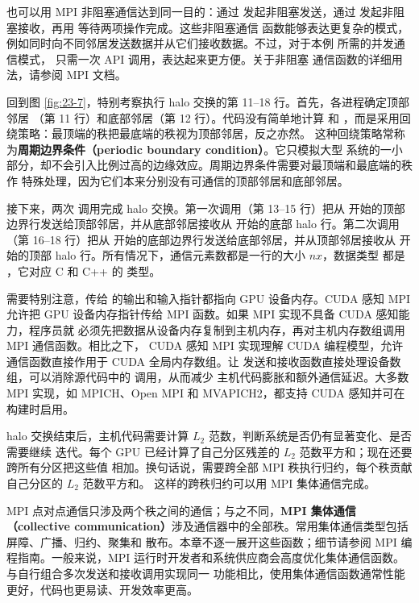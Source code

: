 也可以用 MPI 非阻塞通信达到同一目的：通过  发起非阻塞发送，通过
 发起非阻塞接收，再用  等待两项操作完成。这些非阻塞通信
函数能够表达更复杂的模式，例如同时向不同邻居发送数据并从它们接收数据。不过，对于本例
所需的并发通信模式， 只需一次 API 调用，表达起来更方便。关于非阻塞
通信函数的详细用法，请参阅 MPI 文档\cite{ch23-mpi}。

回到图 \ref{fig:23-7}，特别考察执行 halo 交换的第 11--18 行。首先，各进程确定顶部邻居
（第 11 行）和底部邻居（第 12 行）。代码没有简单地计算  和
，而是采用回绕策略：最顶端的秩把最底端的秩视为顶部邻居，反之亦然。
这种回绕策略常称为\textbf{周期边界条件（periodic boundary condition）}。它只模拟大型
系统的一小部分，却不会引入比例过高的边缘效应。周期边界条件需要对最顶端和最底端的秩作
特殊处理，因为它们本来分别没有可通信的顶部邻居和底部邻居。

接下来，两次  调用完成 halo 交换。第一次调用（第 13--15 行）把从
 开始的顶部边界行发送给顶部邻居，并从底部邻居接收从
 开始的底部 halo 行。第二次调用（第 16--18 行）把从
 开始的底部边界行发送给底部邻居，并从顶部邻居接收从
 开始的顶部 halo 行。所有情况下，通信元素数都是一行的大小 $nx$，数据类型
都是 ，它对应 C 和 C++ 的  类型。

需要特别注意，传给  的输出和输入指针都指向 GPU 设备内存。CUDA 感知
MPI 允许把 GPU 设备内存指针传给 MPI 函数。如果 MPI 实现不具备 CUDA 感知能力，程序员就
必须先把数据从设备内存复制到主机内存，再对主机内存数组调用 MPI 通信函数。相比之下，
CUDA 感知 MPI 实现理解 CUDA 编程模型，允许通信函数直接作用于 CUDA 全局内存数组。让
发送和接收函数直接处理设备数组，可以消除源代码中的  调用，从而减少
主机代码膨胀和额外通信延迟。大多数 MPI 实现，如 MPICH\cite{ch23-mpich}、Open
MPI\cite{ch23-openmpi} 和 MVAPICH2\cite{ch23-mvapich}，都支持 CUDA 感知并可在构建时启用。

halo 交换结束后，主机代码需要计算 $L_2$ 范数，判断系统是否仍有显著变化、是否需要继续
迭代。每个 GPU 已经计算了自己分区残差的 $L_2$ 范数平方和；现在还要跨所有分区把这些值
相加。换句话说，需要跨全部 MPI 秩执行归约，每个秩贡献自己分区的 $L_2$ 范数平方和。
这样的跨秩归约可以用 MPI 集体通信完成。

MPI 点对点通信只涉及两个秩之间的通信；与之不同，\textbf{MPI 集体通信（collective
communication）}涉及通信器中的全部秩。常用集体通信类型包括屏障、广播、归约、聚集和
散布。本章不逐一展开这些函数；细节请参阅 MPI 编程指南\cite{ch23-mpi}。一般来说，MPI
运行时开发者和系统供应商会高度优化集体通信函数。与自行组合多次发送和接收调用实现同一
功能相比，使用集体通信函数通常性能更好，代码也更易读、开发效率更高。

